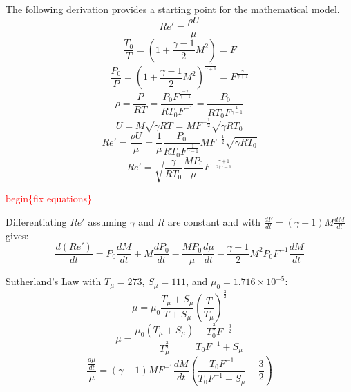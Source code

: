 The following derivation provides a starting point for the mathematical model.
\begin{equation}
    Re' = \frac{\rho U}{\mu}
\end{equation}
\begin{equation}
    \frac{T_0}{T} = (1+\frac{\gamma-1}{2}M^2) = F
\end{equation}
\begin{equation}
    \frac{P_0}{P} = (1+\frac{\gamma-1}{2}M^2)^{\frac{\gamma}{\gamma+1}} = F^{\frac{\gamma}{\gamma+1}}
\end{equation}
\begin{equation}
    \rho = \frac{P}{R T} = \frac{P_0 F^{\frac{-\gamma}{\gamma-1}}}{R T_0 F^{-1}} = \frac{P_0}{R T_0 F^{\frac{1}{\gamma-1}}}
\end{equation}
\begin{equation}
    U = M \sqrt{\gamma R T} = M F^{-\frac{1}{2}} \sqrt{\gamma R T_0}
\end{equation}
\begin{equation*}
    Re' = \frac{\rho U}{\mu} = \frac{1}{\mu} \frac{P_0}{R T_0 F^{\frac{1}{\gamma-1}}} M F^{-\frac{1}{2}} \sqrt{\gamma R T_0}
\end{equation*}
\begin{equation}
    Re' = \sqrt{\frac{\gamma}{R T_0}} \frac{M P_0}{\mu} F^{-\frac{\gamma+1}{2(\gamma -1}}
\end{equation}

\textcolor{red}{begin\{fix equations\}}

\noindent Differentiating $Re'$ assuming $\gamma$ and $R$ are constant and with $\frac{dF}{dt} = (\gamma-1)M \frac{dM}{dt}$ gives:
\begin{equation}
    \frac{d(Re')}{dt} = P_0 \frac{dM}{dt} + M \frac{dP_0}{dt} - \frac{M P_0}{\mu} \frac{d\mu}{dt} - \frac{\gamma+1}{2} M^2 P_0 F^{-1} \frac{dM}{dt}
\end{equation}

\noindent Sutherland's Law with $T_\mu = 273$, $S_\mu = 111$, and $\mu_0 = 1.716 \times 10^{-5}$:
\begin{equation}
    \mu = \mu_0 \frac{T_\mu+S_\mu}{T+S_\mu} \left( \frac{T}{T_\mu} \right)^{\frac{3}{2}}
\end{equation}
\begin{equation}
    \mu = \frac{\mu_0(T_\mu+S_\mu)}{T_\mu^{\frac{3}{2}}} \frac{T_0^{\frac{3}{2}} F^{-\frac{3}{2}}}{T_0 F^{-1}+S_\mu}
\end{equation}
\begin{equation}
    \frac{\frac{d\mu}{dt}}{\mu} = (\gamma-1) M F^{-1} \frac{dM}{dt} \left( \frac{T_0 F^{-1}}{T_0 F^{-1} + S_\mu}-\frac{3}{2} \right)
\end{equation}

